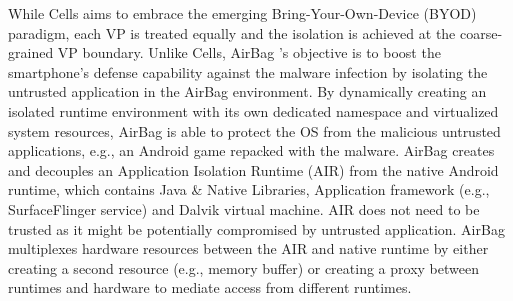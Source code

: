 While Cells aims to embrace the emerging Bring-Your-Own-Device (BYOD) paradigm,
each VP is treated equally and the isolation is achieved at the coarse-grained
VP boundary. Unlike Cells, AirBag \cite{AirBag}'s objective is to boost the
smartphone's defense capability against the malware infection by isolating the
untrusted application in the AirBag environment. By dynamically creating an
isolated runtime environment with its own dedicated namespace and virtualized
system resources, AirBag is able to protect the OS from the malicious untrusted
applications, e.g., an Android game repacked with the malware. AirBag creates
and decouples an Application Isolation Runtime (AIR) from the native Android
runtime, which contains Java \& Native Libraries, Application framework (e.g.,
SurfaceFlinger service) and Dalvik virtual machine.  AIR does not need to be
trusted as it might be potentially compromised by untrusted application. AirBag
multiplexes hardware resources between the AIR and native runtime by either
creating a second resource (e.g., memory buffer) or creating a proxy between
runtimes and hardware to mediate access from different runtimes.



